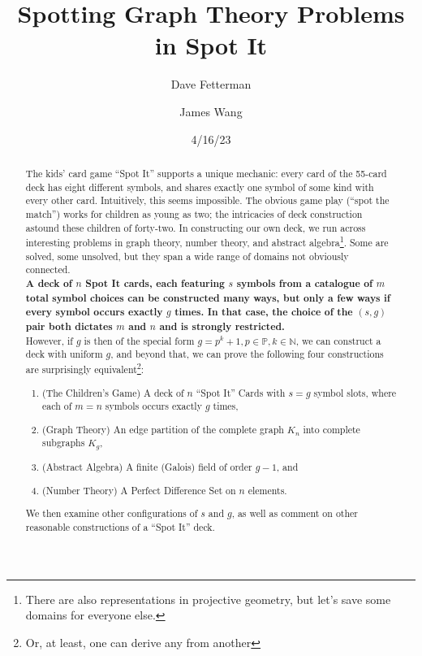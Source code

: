 \documentclass[11pt, oneside]{article} 	%
\title{Spotting Graph Theory Problems in Spot It}
\author[1]{Dave Fetterman}
\author[2]{James Wang}
\affil[1]{Obviously Unemployed}
\affil[2]{Surprisingly Employed}
\date{4/16/23}
\begin{document}
\maketitle

\begin{abstract}

The kids' card game ``Spot It'' supports a unique mechanic: every card of the 55-card deck has eight different symbols, and shares exactly one symbol of some kind with every other card. Intuitively, this seems impossible. The obvious game play (``spot the match'') works for children as young as two; the intricacies of deck construction astound these children of forty-two. In constructing our own deck, we run across interesting problems in graph theory, number theory, and abstract algebra\footnote{There are also representations in projective geometry, but let's save some domains for everyone else.}. Some are solved, some unsolved, but they span a wide range of domains not obviously connected.
\\

\textbf{A deck of $n$ Spot It cards, each featuring $s$ symbols from a catalogue of $m$ total symbol choices can be constructed many ways, but only a few ways if every symbol occurs exactly $g$ times. In that case, the choice of the $(s, g)$ pair both dictates $m$ and $n$ and is strongly restricted.}
\\

However, if $g$ is then of the special form $g=p^k+1, p \in \mathbb{P}, k \in \mathbb{N}$, we can construct a deck with uniform $g$, and beyond that, we can prove the following four constructions are surprisingly equivalent\footnote{Or, at least, one can derive any from another}:
\\
\begin{enumerate}
\item (The Children's Game) A deck of $n$ ``Spot It'' Cards with $s=g$ symbol slots, where each of $m = n$ symbols occurs exactly $g$ times,
\item (Graph Theory) An edge partition of the complete graph $K_n$ into complete subgraphs $K_g$,
\item (Abstract Algebra) A finite (Galois) field of order $g-1$, and
\item (Number Theory) A Perfect Difference Set\cite{1} on $n$ elements.
\end{enumerate} 
 
We then examine other configurations of $s$ and $g$, as well as comment on other reasonable constructions of a ``Spot It'' deck.

\end{abstract}
\end{document}
